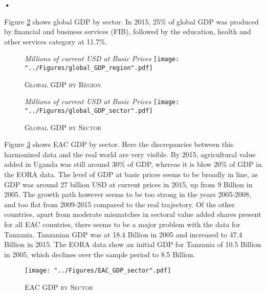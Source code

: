 \textbf{\textbf{•}}\documentclass[a4paper]{article}
\begin{document}
Figure \ref{fig:wld_GDP_sec} shows global GDP by sector. In 2015, 25\% of global GDP was produced by financial and business services (FIB), followed by the education, health and other services category at 11.7\%.



\begin{figure}[h!]
\centering
\caption{\label{fig:wld_GDP_reg}\textsc{Global GDP by Region}}
\small{\textit{Millions of current USD at Basic Prices}}
\texttt{[image: "../Figures/global\_GDP\_region".pdf]} %
\end{figure}
\FloatBarrier

\begin{figure}[h!]
\centering
\caption{\label{fig:wld_GDP_sec}\textsc{Global GDP by Sector}}
\small{\textit{Millions of current USD at Basic Prices}}
\texttt{[image: "../Figures/global\_GDP\_sector".pdf]} %
\end{figure}
\FloatBarrier

Figure \ref{fig:EAC_GDP_sec} shows EAC GDP by sector. Here the discrepancies between this harmonized data and the real world are very visible. By 2015, agricultural value added in Uganda was still around 30\% of GDP, whereas it is blow 20\% of GDP in the EORA data. The level of GDP at basic prices seems to be broadly in line, as GDP was around 27 billion USD at current prices in 2015, up from 9 Billion in 2005. The growth path however seems to be too strong in the years 2005-2008, and too flat from 2009-2015 compared to the real trajectory. Of the other countries, apart from moderate mismatches in sectoral value added shares present for all EAC countries, there seems to be a major problem with the data for Tanzania. Tanzanian GDP was at 18.4 Billion in 2005 and increased to 47.4 Billion in 2015. The EORA data show an initial GDP for Tanzania of 10.5 Billion in 2005, which declines over the sample period to 8.5 Billion. \newline



\begin{figure}[h!]
\centering
\caption{\label{fig:EAC_GDP_sec}\textsc{EAC GDP by Sector}}
\texttt{[image: "../Figures/EAC\_GDP\_sector".pdf]} %
\end{figure}
\FloatBarrier
\end{document}
